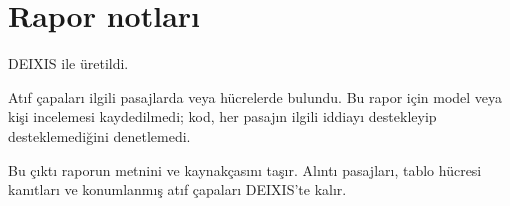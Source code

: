 \documentclass[journal]{IEEEtran}
\begin{document}
\section*{Rapor notları}

DEIXIS ile üretildi.

Atıf çapaları ilgili pasajlarda veya hücrelerde bulundu. Bu rapor için model veya kişi incelemesi kaydedilmedi; kod, her pasajın ilgili iddiayı destekleyip desteklemediğini denetlemedi.

Bu çıktı raporun metnini ve kaynakçasını taşır. Alıntı pasajları, tablo hücresi kanıtları ve konumlanmış atıf çapaları DEIXIS'te kalır.




\end{document}
